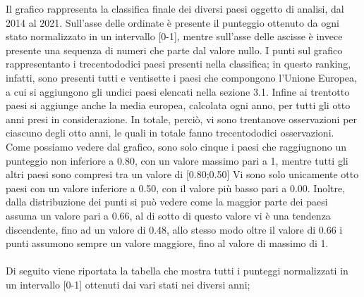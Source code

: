 \documentclass[a4paper,12pt, openright]{report}
\begin{document}
Il grafico rappresenta la classifica finale dei diversi paesi oggetto di analisi, dal 2014 al 2021. Sull'asse delle ordinate è presente il punteggio ottenuto da ogni stato
normalizzato in un intervallo [0-1],
mentre sull'asse delle ascisse è invece presente una sequenza di numeri che parte dal valore nullo. 
I punti sul grafico rappresentanto i trecentododici paesi presenti nella classifica; in questo ranking, infatti, sono presenti tutti e ventisette i paesi che compongono 
l'Unione Europea, a cui si aggiungono gli undici paesi elencati nella sezione 3.1. Infine ai trentotto paesi si aggiunge anche la media europea, calcolata ogni anno, per 
tutti gli otto anni presi in considerazione. In totale, perciò, vi sono trentanove osservazioni per ciascuno degli otto anni, le quali in totale fanno trecentododici 
osservazioni. \\
Come possiamo vedere dal grafico, sono solo cinque i paesi che raggiugnono un punteggio non inferiore a 0.80, con un valore massimo pari a 1,
mentre tutti gli altri paesi sono compresi tra un valore
di [0.80;0.50] Vi sono solo unicamente otto paesi con un valore inferiore a 0.50, con il valore più basso pari a 0.00. Inoltre, 
dalla distribuzione dei punti si può vedere come la maggior parte dei paesi assuma un valore pari a 0.66, al di sotto di questo valore vi è una tendenza discendente, 
fino ad un valore di 0.48, allo stesso modo oltre il valore di 0.66 i punti assumono sempre un valore maggiore, fino al valore di massimo di 1. \\
\\
Di seguito viene riportata la tabella che mostra tutti i punteggi normalizzati in un intervallo [0-1] ottenuti dai vari stati nei diversi anni; 
\newpage 
\end{document}
